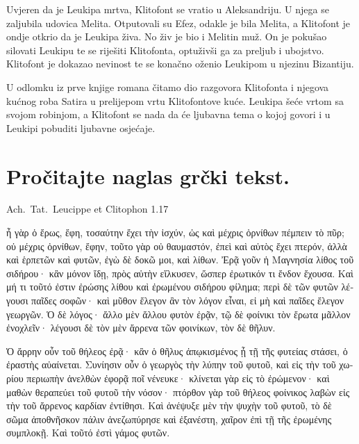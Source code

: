 Uvjeren da je Leukipa mrtva, Klitofont se vratio u Aleksandriju. U njega se zaljubila udovica Melita. Otputovali su Efez, odakle je bila Melita, a Klitofont je ondje otkrio da je Leukipa živa. No živ je bio i Melitin muž. On je pokušao silovati Leukipu te se riješiti Klitofonta, optuživši ga za preljub i ubojstvo. Klitofont je dokazao nevinost te se konačno oženio Leukipom u njezinu Bizantiju. 

U odlomku iz prve knjige romana čitamo dio razgovora Klitofonta i njegova kućnog roba Satira u prelijepom vrtu Klitofontove kuće. Leukipa šeće vrtom sa svojom robinjom, a Klitofont se nada da će ljubavna tema o kojoj govori i u Leukipi pobuditi ljubavne osjećaje.



\section*{Pročitajte naglas grčki tekst.}

Ach.~Tat.\ Leucippe et Clitophon 1.17


\medskip


{\large

\begin{greek}

\noindent ἦ γὰρ ὁ ἔρως, ἔφη, τοσαύτην ἔχει τὴν ἰσχύν, ὡς καὶ μέχρις ὀρνίθων πέμπειν τὸ πῦρ; οὐ μέχρις ὀρνίθων, ἔφην, τοῦτο γὰρ οὐ θαυμαστόν, ἐπεὶ καὶ αὐτὸς ἔχει πτερόν, ἀλλὰ καὶ ἑρπετῶν καὶ φυτῶν, ἐγὼ δὲ δοκῶ μοι, καὶ λίθων. Ἐρᾷ γοῦν ἡ Μαγνησία λίθος τοῦ σιδήρου· κἂν μόνον ἴδῃ, πρὸς αὑτὴν εἵλκυσεν, ὥσπερ ἐρωτικόν τι ἔνδον ἔχουσα. Καὶ μή τι τοῦτό ἐστιν ἐρώσης λίθου καὶ ἐρωμένου σιδήρου φίλημα; περὶ δὲ τῶν φυτῶν λέγουσι παῖδες σοφῶν· καὶ
μῦθον ἔλεγον ἂν τὸν λόγον εἶναι, εἰ μὴ καὶ παῖδες ἔλεγον γεωργῶν. Ὁ δὲ λόγος· ἄλλο μὲν ἄλλου φυτὸν ἐρᾷν, τῷ δὲ φοίνικι τὸν ἔρωτα μᾶλλον ἐνοχλεῖν· λέγουσι δὲ τὸν μὲν ἄρρενα τῶν φοινίκων, τὸν δὲ θῆλυν.

\noindent Ὁ ἄρρην οὖν τοῦ θήλεος ἐρᾷ· κἂν ὁ θῆλυς ἀπῳκισμένος ᾖ τῇ τῆς φυτείας στάσει, ὁ ἐραστὴς αὐαίνεται. Συνίησιν οὖν ὁ γεωργὸς τὴν λύπην τοῦ φυτοῦ, καὶ εἰς τὴν τοῦ χωρίου περιωπὴν ἀνελθὼν ἐφορᾷ ποῖ νένευκε· κλίνεται γὰρ εἰς τὸ ἐρώμενον· καὶ μαθὼν θεραπεύει τοῦ φυτοῦ τὴν νόσον· πτόρθον γὰρ τοῦ θήλεος φοίνικος λαβὼν εἰς τὴν τοῦ ἄρρενος καρδίαν ἐντίθησι. Καὶ ἀνέψυξε μὲν τὴν ψυχὴν τοῦ φυτοῦ, τὸ δὲ σῶμα ἀποθνῆσκον πάλιν ἀνεζωπύρησε καὶ ἐξανέστη, χαῖρον ἐπὶ τῇ τῆς ἐρωμένης  συμπλοκῇ. Καὶ τοῦτό ἐστὶ γάμος φυτῶν.

\end{greek}

}


